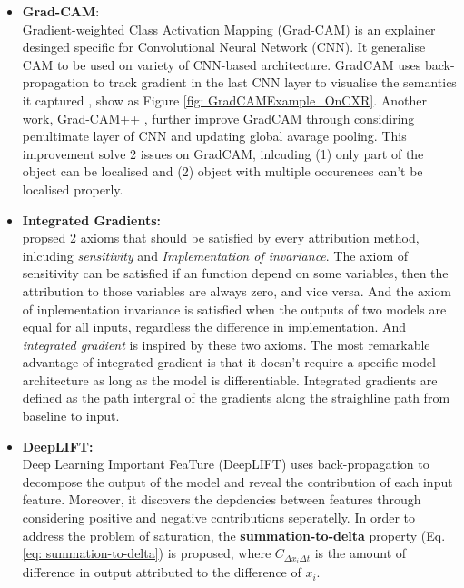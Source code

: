 \begin{itemize}
    \item \textbf{Grad-CAM}: \\ Gradient-weighted Class Activation Mapping (Grad-CAM) is an explainer desinged specific for Convolutional Neural Network (CNN). It generalise CAM \citep{Zhou2015CAM} to be used on variety of CNN-based architecture. GradCAM uses back-propagation to track gradient in the last CNN layer to visualise the semantics it captured \citep{Selvaraju2017GradCAM}, show as Figure \ref{fig: GradCAMExample_OnCXR}. Another work, Grad-CAM++ \citep{Chattopadhay2018GradCAM++}, further improve GradCAM through considiring penultimate layer of CNN and updating global avarage pooling. This improvement solve 2 issues on GradCAM, inlcuding (1) only part of the object can be localised and (2) object with multiple occurences can't be localised properly.
    \item \textbf{Integrated Gradients:} \\ \citet{Sundararajan2017IntegratedGradient} propsed 2 axioms that should be satisfied by every attribution method, inlcuding \textit{sensitivity} and \textit{Implementation of invariance}. The axiom of sensitivity can be satisfied if an function depend on some variables, then the attribution to those variables are always zero, and vice versa. And the axiom of inplementation invariance is satisfied when the outputs of two models are equal for all inputs, regardless the difference in implementation. And \textit{integrated gradient} is inspired by these two axioms. The most remarkable advantage of integrated gradient is that it doesn't require a specific model architecture as long as the model is differentiable. Integrated gradients are defined as the path intergral of the gradients along the straighline path from baseline to input.
    \item \textbf{DeepLIFT:} \\ Deep Learning Important FeaTure (DeepLIFT) \citep{Shrikumar2017DeepLIFT} uses back-propagation to decompose the output of the model and reveal the contribution of each input feature. Moreover, it discovers the depdencies between features through considering positive and negative contributions seperatelly. In order to address the problem of saturation, the \textbf{summation-to-delta} property (Eq. \ref{eq: summation-to-delta}) is proposed, where $C_{\Delta x_{i} \Delta t}$ is the amount of difference in output attributed to the difference of $x_{i}$.
\end{itemize}


